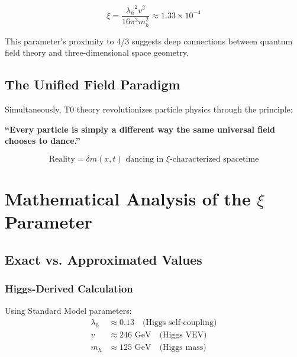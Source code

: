 \documentclass[12pt,a4paper]{article}
\newcommand{\xipar}{\ensuremath{\xi}}
\newcommand{\deltafield}{\ensuremath{\delta m}}
\newcommand{\lambdah}{\ensuremath{\lambda_h}}
\newcommand{\mypi}{\ensuremath{\pi}}
\newcommand{\mytimes}{\ensuremath{\times}}
\newcommand{\myapprox}{\ensuremath{\approx}}
\begin{document}
	\begin{equation}
		\xipar = \frac{\lambdah^2 v^2}{16\mypi^3 m_h^2} \myapprox 1.33 \mytimes 10^{-4}
		\label{eq:xi_fundamental}
	\end{equation}
	
	This parameter's proximity to 4/3 suggests deep connections between quantum field theory and three-dimensional space geometry.
	
	\subsection{The Unified Field Paradigm}
	\label{subsec:unified_field}
	
	Simultaneously, T0 theory revolutionizes particle physics through the principle:
	
	\begin{tcolorbox}[colback=blue!5!white,colframe=blue!75!black,title=Central T0 Principle]
		\textbf{``Every particle is simply a different way the same universal field chooses to dance.''}
		
		\begin{equation}
			\boxed{\text{Reality} = \deltafield(x,t) \text{ dancing in } \xipar \text{-characterized spacetime}}
			\label{eq:fundamental_reality}
		\end{equation}
	\end{tcolorbox}
	
	\section{Mathematical Analysis of the $\xi$ Parameter}
	\label{sec:xi_analysis}
	
	\subsection{Exact vs. Approximated Values}
	\label{subsec:exact_vs_approximated}
	
	\subsubsection{Higgs-Derived Calculation}
	\label{subsubsec:higgs_calculation}
	
	Using Standard Model parameters:
	\begin{align}
		\lambdah &\myapprox 0.13 \quad \text{(Higgs self-coupling)} \\
		v &\myapprox 246 \text{ GeV} \quad \text{(Higgs VEV)} \\
		m_h &\myapprox 125 \text{ GeV} \quad \text{(Higgs mass)}
	\end{align}
	
\end{document}
